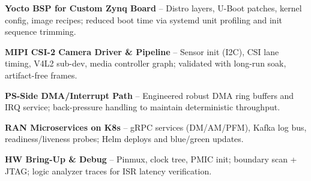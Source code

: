 
\begin{flushleft}
\textbf{Yocto BSP for Custom Zynq Board}  --  Distro layers, U-Boot patches, kernel config, image recipes; reduced boot time via systemd unit profiling and init sequence trimming.
\vspace{0.3\baselineskip}

\textbf{MIPI CSI-2 Camera Driver \& Pipeline}  --  Sensor init (I2C), CSI lane timing, V4L2 sub-dev, media controller graph; validated with long-run soak, artifact-free frames.
\vspace{0.3\baselineskip}

\textbf{PS-Side DMA/Interrupt Path}  --  Engineered robust DMA ring buffers and IRQ service; back-pressure handling to maintain deterministic throughput.
\vspace{0.3\baselineskip}

\textbf{RAN Microservices on K8s}  --  gRPC services (DM/AM/PFM), Kafka log bus, readiness/liveness probes; Helm deploys and blue/green updates.
\vspace{0.3\baselineskip}

\textbf{HW Bring-Up \& Debug}  --  Pinmux, clock tree, PMIC init; boundary scan + JTAG; logic analyzer traces for ISR latency verification.
\end{flushleft}



